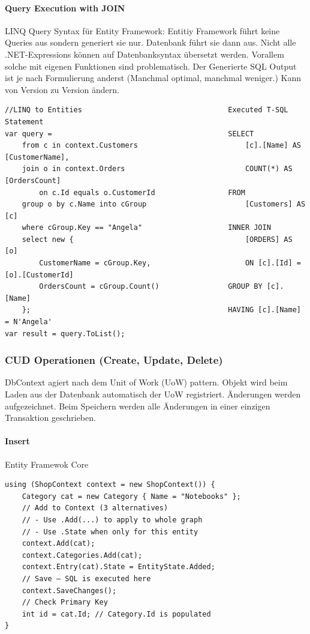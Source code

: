 \documentclass[
a4paper,
oneside,
10pt,
fleqn,
headsepline,
toc=listofnumbered, 
bibliography=totocnumbered]{scrartcl}
\begin{document}
\paragraph{Query Execution with JOIN}
LINQ Query Syntax für Entity Framework:
Entitiy Framework führt keine Queries aus sondern generiert sie nur. Datenbank führt sie dann aus. Nicht alle .NET-Expressions können auf Datenbanksyntax übersetzt werden. Vorallem solche mit eigenen Funktionen sind problematisch. Der Generierte SQL Output ist je nach Formulierung anderst (Manchmal optimal, manchmal weniger.) Kann von Version zu Version ändern.
\begin{lstlisting}
//LINQ to Entities                                  Executed T-SQL Statement
var query =                                         SELECT
    from c in context.Customers                         [c].[Name] AS [CustomerName],
    join o in context.Orders                            COUNT(*) AS [OrdersCount]
        on c.Id equals o.CustomerId                 FROM
    group o by c.Name into cGroup                       [Customers] AS [c]
    where cGroup.Key == "Angela"                    INNER JOIN
    select new {                                        [ORDERS] AS [o]
        CustomerName = cGroup.Key,                      ON [c].[Id] = [o].[CustomerId]
        OrdersCount = cGroup.Count()                GROUP BY [c].[Name]
    };                                              HAVING [c].[Name] = N'Angela'
var result = query.ToList();
\end{lstlisting}

\subsubsection{CUD Operationen (Create, Update, Delete)}
DbContext agiert nach dem Unit of Work (UoW) pattern. Objekt wird beim Laden aus der Datenbank automatisch der UoW registriert. Änderungen werden aufgezeichnet. Beim Speichern werden alle Änderungen in einer einzigen Transaktion geschrieben.
\paragraph{Insert} Entity Framewok Core
\begin{lstlisting}
using (ShopContext context = new ShopContext()) {
    Category cat = new Category { Name = "Notebooks" };
    // Add to Context (3 alternatives)
    // - Use .Add(...) to apply to whole graph
    // - Use .State when only for this entity
    context.Add(cat);
    context.Categories.Add(cat);
    context.Entry(cat).State = EntityState.Added;
    // Save – SQL is executed here
    context.SaveChanges();
    // Check Primary Key
    int id = cat.Id; // Category.Id is populated
}
\end{lstlisting}
\end{document}
